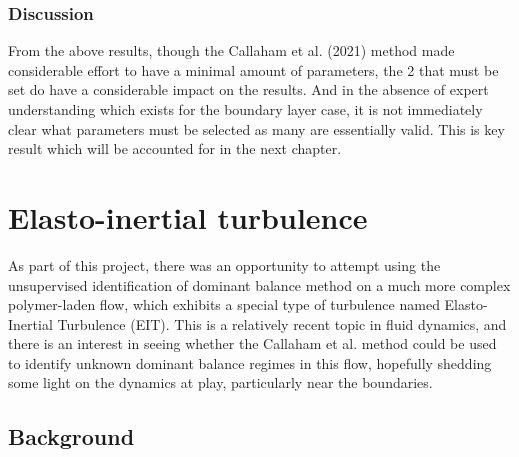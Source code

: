 \documentclass[12pt]{report} %
\begin{document}
\subsection{Discussion}

From the above results, though the Callaham et al. (2021)\cite{callaham2021learning} method made considerable effort to have a minimal amount of parameters, the 2 that must be set do have a considerable impact on the results. And in the absence of expert understanding which exists for the boundary layer case, it is not immediately clear what parameters must be selected as many are essentially valid. This is key result which will be accounted for in the next chapter.

\chapter{Elasto-inertial turbulence}

As part of this project, there was an opportunity to attempt using the unsupervised identification of dominant balance method on a much more complex polymer-laden flow, which exhibits a special type of turbulence named Elasto-Inertial Turbulence (EIT). This is a relatively recent topic in fluid dynamics, and there is an interest in seeing whether the Callaham et al. method could be used to identify unknown dominant balance regimes in this flow, hopefully shedding some light on the dynamics at play, particularly near the boundaries.

\section{Background}
\end{document}

